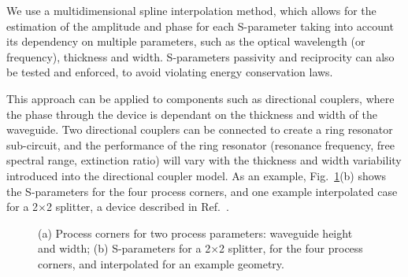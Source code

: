 \documentclass[journal]{spie}
\begin{document}
We use a multidimensional spline interpolation method, which allows for the estimation of the amplitude and phase for each S-parameter taking into account its dependency on multiple parameters, such as the optical wavelength (or frequency), thickness and width.  S-parameters passivity and reciprocity can also be tested and enforced, to avoid violating energy conservation laws.  

This approach can be applied to components such as directional couplers, where the phase through the device is dependant on the thickness and width of the waveguide.  Two directional couplers can be connected to create a ring resonator sub-circuit, and the performance of the ring resonator (resonance frequency, free spectral range, extinction ratio) will vary with the thickness and width variability introduced into the directional coupler model.  As an example, Fig.~\ref{s-interpolation}(b) shows the S-parameters for the four process corners, and one example interpolated case for a 2$\times$2 splitter, a device described in Ref.~. 


\begin{figure}[tbp]
	\centering
{} 
    \caption[]{(a) Process corners for two process parameters: waveguide height and width; (b) S-parameters for  a 2$\times$2  splitter, for the four process corners, and interpolated for an example geometry.}
    \label{s-interpolation}
\end{figure}
\end{document}
